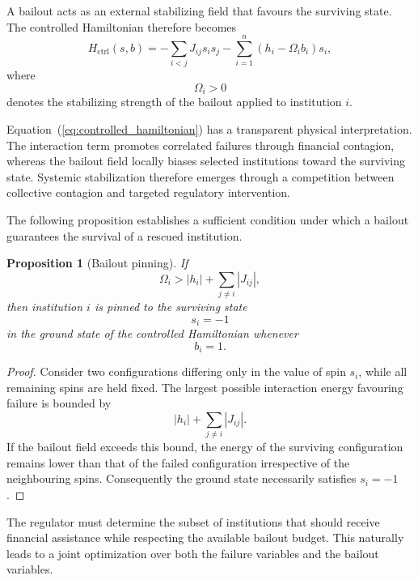 \documentclass[aps,reprint,superscriptaddress,pra]{revtex4-2}
\newtheorem{proposition}{Proposition}
\begin{document}
A bailout acts as an external stabilizing field that favours the surviving state. The controlled Hamiltonian therefore becomes
\begin{equation}
H_{\mathrm{ctrl}}(s,b)
=
-\sum_{i<j}J_{ij}s_is_j
-
\sum_{i=1}^{n}
\left(
h_i-\Omega_i b_i
\right)s_i,
\label{eq:controlled_hamiltonian}
\end{equation}
where
\begin{equation}
\Omega_i>0
\end{equation}
denotes the stabilizing strength of the bailout applied to institution $i$.

Equation~(\ref{eq:controlled_hamiltonian}) has a transparent physical interpretation. The interaction term promotes correlated failures through financial contagion, whereas the bailout field locally biases selected institutions toward the surviving state. Systemic stabilization therefore emerges through a competition between collective contagion and targeted regulatory intervention.

The following proposition establishes a sufficient condition under which a bailout guarantees the survival of a rescued institution.

\begin{proposition}[Bailout pinning]
If
\begin{equation}
\Omega_i
>
|h_i|
+
\sum_{j\neq i}|J_{ij}|,
\label{eq:pinning_condition}
\end{equation}
then institution $i$ is pinned to the surviving state
\begin{equation}
s_i=-1
\end{equation}
in the ground state of the controlled Hamiltonian whenever
\begin{equation}
b_i=1.
\end{equation}
\end{proposition}

\begin{proof}
Consider two configurations differing only in the value of spin $s_i$, while all remaining spins are held fixed. The largest possible interaction energy favouring failure is bounded by
\[
|h_i|+\sum_{j\neq i}|J_{ij}|.
\]
If the bailout field exceeds this bound, the energy of the surviving configuration remains lower than that of the failed configuration irrespective of the neighbouring spins. Consequently the ground state necessarily satisfies $s_i=-1$.
\end{proof}

The regulator must determine the subset of institutions that should receive financial assistance while respecting the available bailout budget. This naturally leads to a joint optimization over both the failure variables and the bailout variables.
\end{document}
